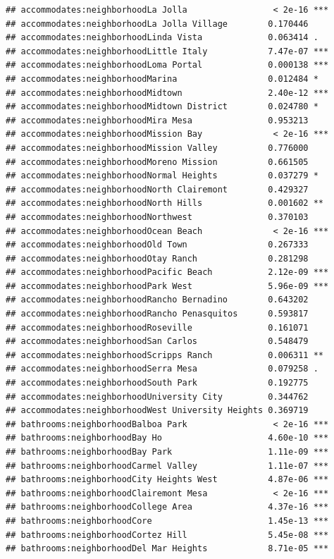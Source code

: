 \documentclass[
]{book}
\begin{document}
\begin{verbatim}
## accommodates:neighborhoodLa Jolla                 < 2e-16 ***
## accommodates:neighborhoodLa Jolla Village        0.170446    
## accommodates:neighborhoodLinda Vista             0.063414 .  
## accommodates:neighborhoodLittle Italy            7.47e-07 ***
## accommodates:neighborhoodLoma Portal             0.000138 ***
## accommodates:neighborhoodMarina                  0.012484 *  
## accommodates:neighborhoodMidtown                 2.40e-12 ***
## accommodates:neighborhoodMidtown District        0.024780 *  
## accommodates:neighborhoodMira Mesa               0.953213    
## accommodates:neighborhoodMission Bay              < 2e-16 ***
## accommodates:neighborhoodMission Valley          0.776000    
## accommodates:neighborhoodMoreno Mission          0.661505    
## accommodates:neighborhoodNormal Heights          0.037279 *  
## accommodates:neighborhoodNorth Clairemont        0.429327    
## accommodates:neighborhoodNorth Hills             0.001602 ** 
## accommodates:neighborhoodNorthwest               0.370103    
## accommodates:neighborhoodOcean Beach              < 2e-16 ***
## accommodates:neighborhoodOld Town                0.267333    
## accommodates:neighborhoodOtay Ranch              0.281298    
## accommodates:neighborhoodPacific Beach           2.12e-09 ***
## accommodates:neighborhoodPark West               5.96e-09 ***
## accommodates:neighborhoodRancho Bernadino        0.643202    
## accommodates:neighborhoodRancho Penasquitos      0.593817    
## accommodates:neighborhoodRoseville               0.161071    
## accommodates:neighborhoodSan Carlos              0.548479    
## accommodates:neighborhoodScripps Ranch           0.006311 ** 
## accommodates:neighborhoodSerra Mesa              0.079258 .  
## accommodates:neighborhoodSouth Park              0.192775    
## accommodates:neighborhoodUniversity City         0.344762    
## accommodates:neighborhoodWest University Heights 0.369719    
## bathrooms:neighborhoodBalboa Park                 < 2e-16 ***
## bathrooms:neighborhoodBay Ho                     4.60e-10 ***
## bathrooms:neighborhoodBay Park                   1.11e-09 ***
## bathrooms:neighborhoodCarmel Valley              1.11e-07 ***
## bathrooms:neighborhoodCity Heights West          4.87e-06 ***
## bathrooms:neighborhoodClairemont Mesa             < 2e-16 ***
## bathrooms:neighborhoodCollege Area               4.37e-16 ***
## bathrooms:neighborhoodCore                       1.45e-13 ***
## bathrooms:neighborhoodCortez Hill                5.45e-08 ***
## bathrooms:neighborhoodDel Mar Heights            8.71e-05 ***

\end{verbatim}
\end{document}
